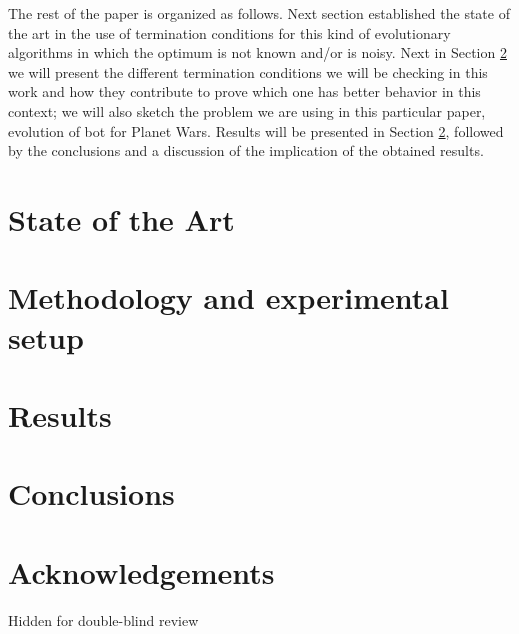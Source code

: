 \documentclass[runningheads,a4paper]{llncs}
\begin{document}
The rest of the paper is organized as follows. Next section
established the state of the art in the use of termination conditions
for this kind of evolutionary algorithms in which the optimum is not
known and/or is noisy. Next in Section \ref{sec:met} we will present the different termination
conditions we will be checking in this work and how they contribute to
prove which one has better behavior in this context; we will also
sketch the problem we are using in this particular paper, evolution of
bot for Planet Wars. Results will be presented in Section
\ref{sec:met}, followed by the conclusions and a discussion of the
implication of the obtained results.

\section{State of the Art}

\section{Methodology and experimental setup}
\label{sec:met}

\section{Results}
\label{sec:res}

\section{Conclusions}

\section*{Acknowledgements}

Hidden for double-blind review



\end{document}
